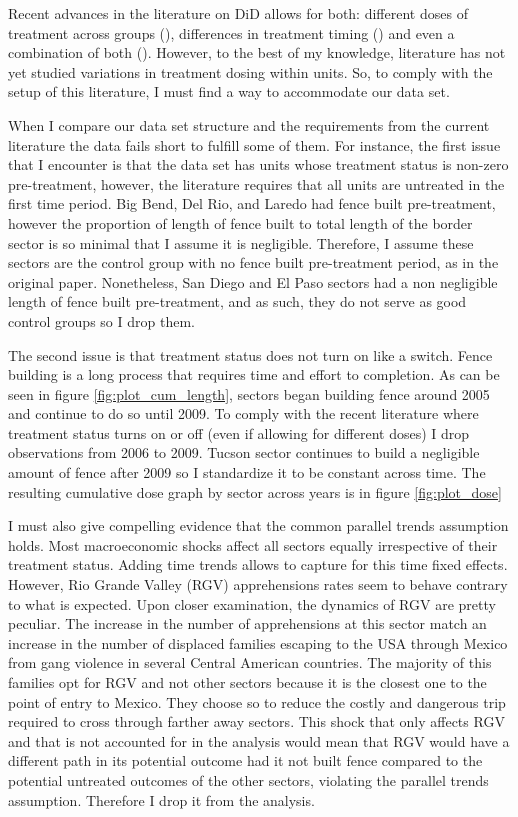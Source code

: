 \documentclass[titlepage]{article}
\theoremstyle{plain}
\theoremstyle{plain}
\begin{document}
Recent advances in the literature on DiD allows for both: different doses of treatment across groups (\cite{callaway2021differenceindifferences, chaisemartin2022}), differences in treatment timing (\cite{Callaway2021, GOODMANBACON2021254}) and even a combination of both (\cite{callaway2021differenceindifferences}). However, to the best of my knowledge, literature has not yet studied variations in treatment dosing within units. So, to comply with the setup of this literature, I must find a way to accommodate our data set.

When I compare our data set structure and the requirements from the current literature the data fails short to fulfill some of them. For instance, the first issue that I encounter is that the data set has units whose treatment status is non-zero pre-treatment, however, the literature requires that all units are untreated in the first time period. Big Bend, Del Rio, and Laredo had fence built pre-treatment, however the proportion of length of fence built to total length of the border sector is so minimal that I assume it is negligible. Therefore, I assume these sectors are the control group with no fence built pre-treatment period, as in the original paper. Nonetheless, San Diego and El Paso sectors had a non negligible length of fence built pre-treatment, and as such, they do not serve as good control groups so I drop them.

The second issue is that treatment status does not turn on like a switch. Fence building is a long process that requires time and effort to completion. As can be seen in figure \ref{fig:plot_cum_length}, sectors began building fence around 2005 and continue to do so until 2009. To comply with the recent literature where treatment status turns on or off (even if allowing for different doses) I drop observations from 2006 to 2009. Tucson sector continues to build a negligible amount of fence after 2009 so I standardize it to be constant across time. The resulting cumulative dose graph by sector across years is in figure \ref{fig:plot_dose}

I must also give compelling evidence that the common parallel trends assumption holds. Most macroeconomic shocks affect all sectors equally irrespective of their treatment status. Adding time trends allows to capture for this time fixed effects. However, Rio Grande Valley (RGV) apprehensions rates seem to behave contrary to what is expected. Upon closer examination, the dynamics of RGV are pretty peculiar. The increase in the number of apprehensions at this sector match an increase in the number of displaced families escaping to the USA through Mexico from gang violence in several Central American countries. The majority of this families opt for RGV and not other sectors because it is the closest one to the point of entry to Mexico. They choose so to reduce the costly and dangerous trip required to cross through farther away sectors. This shock that only affects RGV and that is not accounted for in the analysis would mean that RGV would have a different path in its potential outcome had it not built fence compared to the potential untreated outcomes of the other sectors, violating the parallel trends assumption. Therefore I drop it from the analysis.
\end{document}

